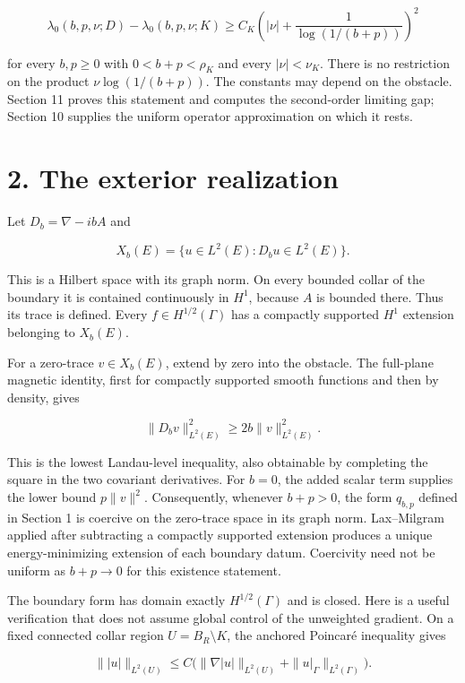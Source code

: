 \documentclass[11pt]{article}
\begin{document}
\[\lambda_0(b,p,\nu;D)-\lambda_0(b,p,\nu;K)
\geq C_K\left(|\nu|+\frac1{\log(1/(b+p))}\right)^2\]

for every \(b,p\geq0\) with \(0<b+p<\rho_K\) and every \(|\nu|<\nu_K\).
There is no restriction on the product \(\nu\log(1/(b+p))\). The
constants may depend on the obstacle. Section 11 proves this statement
and computes the second-order limiting gap; Section 10 supplies the
uniform operator approximation on which it rests.

\section{2. The exterior realization}\label{the-exterior-realization}

Let \(D_b=\nabla-ibA\) and

\[X_b(E)=\{u\in L^2(E):D_bu\in L^2(E)\}.\]

This is a Hilbert space with its graph norm. On every bounded collar of
the boundary it is contained continuously in \(H^1\), because \(A\) is
bounded there. Thus its trace is defined. Every \(f\in H^{1/2}(\Gamma)\)
has a compactly supported \(H^1\) extension belonging to \(X_b(E)\).

For a zero-trace \(v\in X_b(E)\), extend by zero into the obstacle. The
full-plane magnetic identity, first for compactly supported smooth
functions and then by density, gives

\[\|D_bv\|_{L^2(E)}^2\geq2b\|v\|_{L^2(E)}^2.\]

This is the lowest Landau-level inequality, also obtainable by
completing the square in the two covariant derivatives. For \(b=0\), the
added scalar term supplies the lower bound \(p\|v\|^2\). Consequently,
whenever \(b+p>0\), the form \(q_{b,p}\) defined in Section 1 is
coercive on the zero-trace space in its graph norm. Lax--Milgram applied
after subtracting a compactly supported extension produces a unique
energy-minimizing extension of each boundary datum. Coercivity need not
be uniform as \(b+p\to0\) for this existence statement.

The boundary form has domain exactly \(H^{1/2}(\Gamma)\) and is closed.
Here is a useful verification that does not assume global control of the
unweighted gradient. On a fixed connected collar region
\(U=B_R\setminus K\), the anchored Poincaré inequality gives

\[\||u|\|_{L^2(U)}\leq C\bigl(\|\nabla|u|\|_{L^2(U)}+\|u|_\Gamma\|_{L^2(\Gamma)}\bigr).\]
\end{document}
